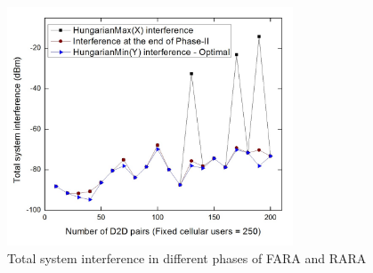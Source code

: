\documentclass{ieeeaccess}
\begin{document}
\begin{figure}[t]
\centering
\includegraphics[width=85mm]{Graph/example_interference.jpg}
\vspace{-0.3cm}
\caption{Total system interference in different phases of FARA and RARA\label{fig:example_inter)}}
\end{figure}

\smallskip
 
\end{document}
